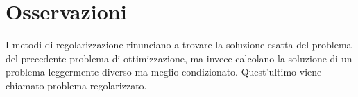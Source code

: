 \section{Osservazioni}
I metodi di regolarizzazione rinunciano a trovare la soluzione esatta del problema del 
precedente problema di ottimizzazione, ma invece calcolano la soluzione di un problema 
leggermente diverso ma meglio condizionato. Quest’ultimo viene chiamato problema regolarizzato. 
